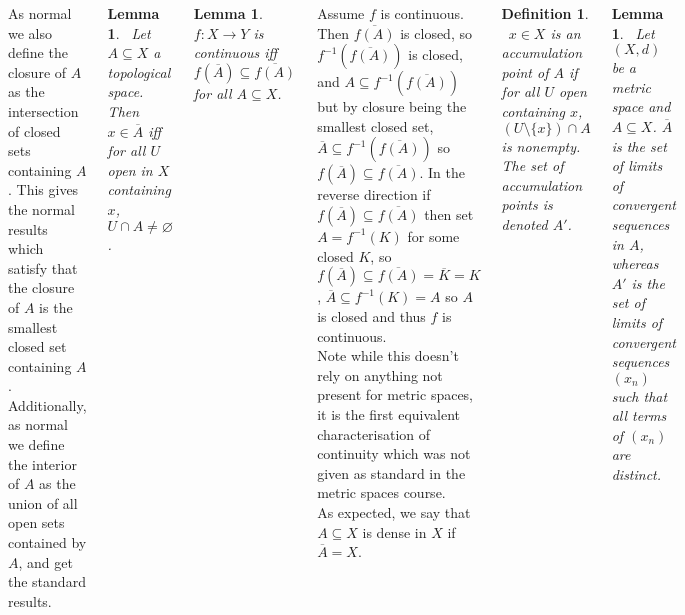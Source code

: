 \documentclass{tikzposter} %
\newtheorem{lemma}[theorem]{Lemma}
\newtheorem{definition}{Definition}
\begin{document}
\begin{columns}
{  As normal we also define the closure of $A$ as the intersection of closed sets containing $A$. This gives the normal results which satisfy that the closure of $A$ is the smallest closed set containing $A$. \\

  Additionally, as normal we define the interior of $A$ as the union of all open sets contained by $A$, and get the standard results. \\

  \begin{lemma}
  \ Let $A \subseteq X$ a topological space. Then $x \in \overline{A}$ iff for all $U$ open in $X$ containing $x$, $U \cap A \neq \varnothing$.
  \end{lemma}
  \hphantom{}

  \begin{lemma}
  \ $f : X \to Y$ is continuous iff $f(\overline{A}) \subseteq \overline{f(A)}$ for all $A \subseteq X$.
  \end{lemma}
  \hphantom{}

  Assume $f$ is continuous. Then $\overline{f(A)}$ is closed, so $f^{-1}(\overline{f(A)})$ is closed, and $A \subseteq f^{-1}(\overline{f(A)})$ but by closure being the smallest closed set, $\overline{A} \subseteq f^{-1}(\overline{f(A)})$ so $f(\overline{A}) \subseteq \overline{f(A)}$. In the reverse direction if $f(\overline{A}) \subseteq \overline{f(A)}$ then set $A = f^{-1}(K)$ for some closed $K$, so $f(\overline{A}) \subseteq \overline{f(A)} = \overline{K} = K$, $\overline{A} \subseteq f^{-1}(K) = A$ so $A$ is closed and thus $f$ is continuous. \\

  Note while this doesn't rely on anything not present for metric spaces, it is the first equivalent characterisation of continuity which was not given as standard in the metric spaces course. \\

  As expected, we say that $A \subseteq X$ is dense in $X$ if $\overline{A} = X$. \\

  \begin{definition}
  \ $x \in X$ is an accumulation point of $A$ if for all $U$ open containing $x$, $(U \setminus \{x\}) \cap A$ is nonempty. The set of accumulation points is denoted $A'$.
  \end{definition}
  \hphantom{}

  \begin{lemma}
  \ Let $(X, d)$ be a metric space and $A \subseteq X$. $\overline{A}$ is the set of limits of convergent sequences in $A$, whereas $A'$ is the set of limits of convergent sequences $(x_{n})$ such that all terms of $(x_{n})$ are distinct.
  \end{lemma}
  \hphantom{}

}
\end{columns}
\end{document}
